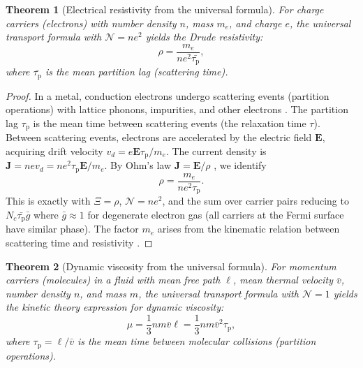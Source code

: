 \documentclass[twocolumn,10pt,a4paper]{article}
\newtheorem{theorem}{Theorem}[section]
\theoremstyle{definition}
\theoremstyle{remark}
\newcommand{\tauP}{\tau_{\mathrm{p}}}
\newcommand{\vect}[1]{\boldsymbol{#1}}
\begin{document}
\begin{theorem}[Electrical resistivity from the universal formula]\label{thm:drude}
For charge carriers (electrons) with number density $n$, mass $m_e$, and charge $e$, the universal transport formula with $\mathcal{N} = ne^2$ yields the Drude resistivity:
\begin{equation}\label{eq:drude}
\rho = \frac{m_e}{ne^2 \bar{\tauP}},
\end{equation}
where $\bar{\tauP}$ is the mean partition lag (scattering time).
\end{theorem}

\begin{proof}
In a metal, conduction electrons undergo scattering events (partition operations) with lattice phonons, impurities, and other electrons \citep{Drude1900, Ashcroft1976}. The partition lag $\tauP$ is the mean time between scattering events (the relaxation time $\tau$). Between scattering events, electrons are accelerated by the electric field $\vect{E}$, acquiring drift velocity $v_d = e\vect{E}\tauP/m_e$. The current density is $\vect{J} = nev_d = ne^2\tauP\vect{E}/m_e$. By Ohm's law $\vect{J} = \vect{E}/\rho$ \citep{Ohm1827}, we identify
\begin{equation}
\rho = \frac{m_e}{ne^2\tauP}.
\end{equation}
This is exactly  with $\Xi = \rho$, $\mathcal{N} = ne^2$, and the sum over carrier pairs reducing to $N_c \bar{\tauP} \bar{g}$ where $\bar{g} \approx 1$ for degenerate electron gas (all carriers at the Fermi surface have similar phase). The factor $m_e$ arises from the kinematic relation between scattering time and resistivity \citep{Ziman1960}.
\end{proof}

\begin{theorem}[Dynamic viscosity from the universal formula]\label{thm:viscosity}
For momentum carriers (molecules) in a fluid with mean free path $\ell$, mean thermal velocity $\bar{v}$, number density $n$, and mass $m$, the universal transport formula with $\mathcal{N} = 1$ yields the kinetic theory expression for dynamic viscosity:
\begin{equation}\label{eq:viscosity}
\mu = \frac{1}{3} n m \bar{v} \ell = \frac{1}{3} n m \bar{v}^2 \tauP,
\end{equation}
where $\tauP = \ell / \bar{v}$ is the mean time between molecular collisions (partition operations).
\end{theorem}
\end{document}
